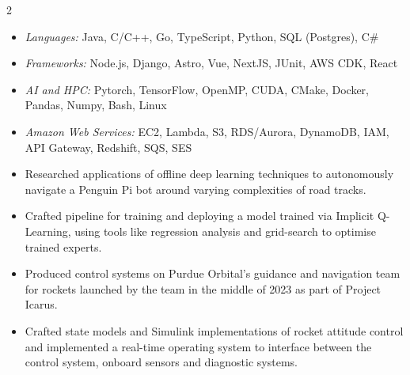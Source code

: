 \documentclass[10pt,a4paper,ragged2e]{altacv}
\begin{document}
\begin{paracol}{2}
\begin{itemize}
	\end{itemize}






	\divider


	\smallskip
	\begin{itemize}
		\item \textit{Languages:} Java, C/C++, Go, TypeScript, Python, SQL (Postgres), C\#
		\item \textit{Frameworks:} Node.js, Django, Astro, Vue, NextJS, JUnit, AWS CDK, React
		\item \textit{AI and HPC:} Pytorch, TensorFlow, OpenMP, CUDA, CMake, Docker, Pandas, Numpy, Bash, Linux
		\item \textit{Amazon Web Services:} EC2, Lambda, S3, RDS/Aurora, DynamoDB, IAM, API Gateway, Redshift, SQS, SES
	\end{itemize}


	\switchcolumn


	\begin{itemize}
		\item Researched applications of offline deep learning techniques to autonomously navigate a Penguin Pi bot around varying complexities of road tracks.
		\item Crafted pipeline for training and deploying a model trained via Implicit Q-Learning, using tools like regression analysis and grid-search to optimise trained experts.
	\end{itemize}

	\divider

	\begin{itemize}
		\item Produced control systems on Purdue Orbital's guidance and navigation team for rockets launched by the team in the middle of 2023 as part of Project Icarus.
		\item Crafted state models and Simulink implementations of rocket attitude control and implemented a real-time operating system to interface between the control system, onboard sensors and diagnostic systems.
	\end{itemize}


\end{paracol}
\end{document}
